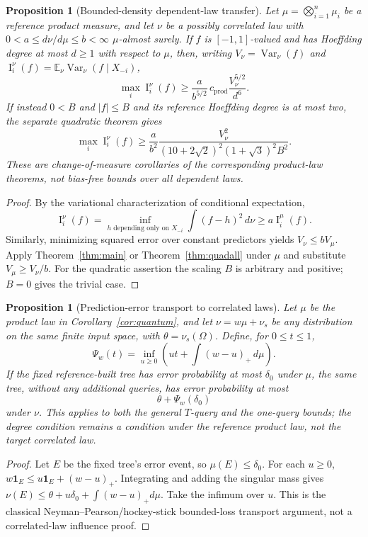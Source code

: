 \documentclass[11pt]{article}
\numberwithin{equation}{section}
\newtheorem{proposition}[theorem]{Proposition}
\theoremstyle{remark}
\newcommand{\Inf}{\operatorname{I}}
\newcommand{\cprod}{c_{\mathrm{prod}}}
\newcommand{\Kquad}{(10+2\sqrt2)^2(1+\sqrt3)^2}
\begin{document}
\begin{proposition}[Bounded-density dependent-law transfer]\label{prop:corrdens}
Let $\mu=\bigotimes_{i=1}^n\mu_i$ be a reference product measure,
and let $\nu$ be a possibly correlated law with
\(0<a\le d\nu/d\mu\le b<\infty\) $\mu$-almost surely.
If $f$ is $[-1,1]$-valued and has Hoeffding degree at most $d\ge1$
\emph{with respect to $\mu$}, then, writing
$V_\nu=\operatorname{Var}_\nu(f)$ and
$\Inf_i^\nu(f)=\mathbb E_\nu\operatorname{Var}_\nu(f\mid X_{-i})$,
\[
 \max_i\Inf_i^\nu(f)\ge
 \frac{a}{b^{5/2}}\,\cprod\frac{V_\nu^{5/2}}{d^6}.
\]
If instead $0<B$ and $|f|\le B$ and its reference Hoeffding degree is at most
two, the separate quadratic theorem gives
\[
 \max_i\Inf_i^\nu(f)\ge
 \frac{a}{b^2}\frac{V_\nu^2}
 {\Kquad B^2}.
\]
These are change-of-measure corollaries of the corresponding
product-law theorems, not bias-free bounds over all dependent laws.
\end{proposition}
\begin{proof}
By the variational characterization of conditional expectation,
\[
 \Inf_i^\nu(f)
 =\inf_{h\text{ depending only on }X_{-i}}
    \int(f-h)^2\,d\nu
 \ge a\Inf_i^\mu(f).
\]
Similarly, minimizing squared error over constant predictors yields
$V_\nu\le bV_\mu$. Apply Theorem~\ref{thm:main} or
Theorem~\ref{thm:quadall} under $\mu$ and substitute
$V_\mu\ge V_\nu/b$. For the quadratic assertion the scaling
$B$ is arbitrary and positive; $B=0$ gives the trivial case.
\end{proof}

\begin{proposition}[Prediction-error transport to correlated laws]\label{prop:corrquant}
Let $\mu$ be the product law in Corollary~\ref{cor:quantum}, and
let $\nu=w\mu+\nu_s$ be \emph{any} distribution on the same finite
input space, with $\theta=\nu_s(\Omega)$.
Define, for $0\le t\le1$,
\[
 \Psi_w(t)=\inf_{u\ge0}\left(ut+\int(w-u)_+\,d\mu\right).
 \]
If the fixed reference-built tree has error probability at most
$\delta_0$ under $\mu$, the \emph{same} tree, without any additional
queries, has error probability at most
\[
 \theta+\Psi_w(\delta_0)
\]
under $\nu$. This applies to both the general $T$-query and the
one-query bounds; the degree condition remains a condition under the
reference product law, not the target correlated law.
\end{proposition}
\begin{proof}
Let $E$ be the fixed tree's error event, so $\mu(E)\le\delta_0$.
For each $u\ge0$,
$w\mathbf 1_E\le u\mathbf 1_E+(w-u)_+$.
Integrating and adding the singular mass gives
$\nu(E)\le\theta+u\delta_0+\int(w-u)_+d\mu$.
Take the infimum over $u$. This is the classical
Neyman--Pearson/hockey-stick bounded-loss transport argument,
not a correlated-law influence proof.
\end{proof}
\end{document}
